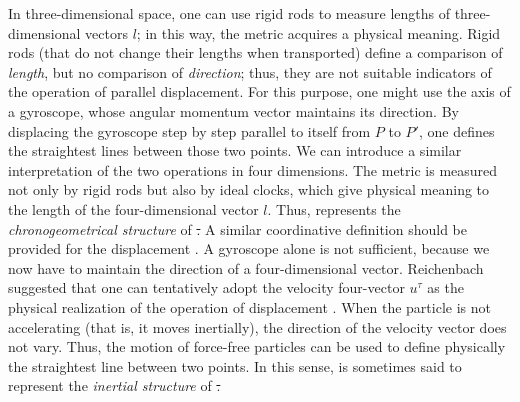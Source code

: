 \documentclass[final]{article}
\begin{document}
In three-dimensional space, one can use rigid rods to measure lengths of three-dimensional vectors $l$; in this way, the metric acquires a physical meaning. Rigid rods (that do not change their lengths when transported) define a comparison of \emph{length}, but no comparison of \emph{direction}; thus, they are not suitable indicators of the operation of parallel displacement. For this purpose, one might use the axis of a gyroscope, whose angular momentum vector maintains its direction. By displacing the gyroscope step by step parallel to itself from $P$ to $P'$, one defines the straightest lines between those two points. We can introduce a similar interpretation of the two operations in four dimensions. The metric \gmn is measured not only by rigid rods but also by ideal clocks, which give physical meaning to the length of the four-dimensional vector $l$. Thus, \gmn represents the \emph{chronogeometrical structure} of \st. A similar coordinative definition should be provided for the displacement \Gtmn. A gyroscope alone is not sufficient, because we now have to maintain the direction of a four-dimensional vector. Reichenbach suggested that one can tentatively adopt the velocity four-vector $u^\tau$ as the physical realization of the operation of displacement \citep[]{Eddington1923}. When the particle is not accelerating (that is, it moves inertially), the direction of the velocity vector does not vary. Thus, the motion of force-free particles can be used to define physically the straightest line between two \spti points. In this sense, \Gtmn is sometimes said to represent the \emph{inertial structure} of \st. 
\end{document}

